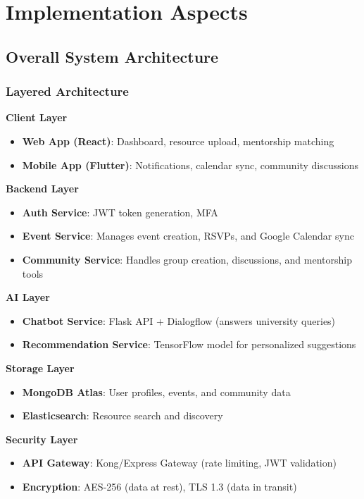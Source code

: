 \chapter{Implementation Aspects}
\label{chap:implementation}

\section{Overall System Architecture}
\label{sec:system_architecture}

\subsection{Layered Architecture}

\textbf{Client Layer}
\begin{itemize}
    \item \textbf{Web App (React)}: Dashboard, resource upload, mentorship matching
    \item \textbf{Mobile App (Flutter)}: Notifications, calendar sync, community discussions
\end{itemize}

\textbf{Backend Layer}
\begin{itemize}
    \item \textbf{Auth Service}: JWT token generation, MFA
    \item \textbf{Event Service}: Manages event creation, RSVPs, and Google Calendar sync
    \item \textbf{Community Service}: Handles group creation, discussions, and mentorship tools
\end{itemize}

\textbf{AI Layer}
\begin{itemize}
    \item \textbf{Chatbot Service}: Flask API + Dialogflow (answers university queries)
    \item \textbf{Recommendation Service}: TensorFlow model for personalized suggestions
\end{itemize}

\textbf{Storage Layer}
\begin{itemize}
    \item \textbf{MongoDB Atlas}: User profiles, events, and community data
    \item \textbf{Elasticsearch}: Resource search and discovery
\end{itemize}

\textbf{Security Layer}
\begin{itemize}
    \item \textbf{API Gateway}: Kong/Express Gateway (rate limiting, JWT validation)
    \item \textbf{Encryption}: AES-256 (data at rest), TLS 1.3 (data in transit)
\end{itemize}

